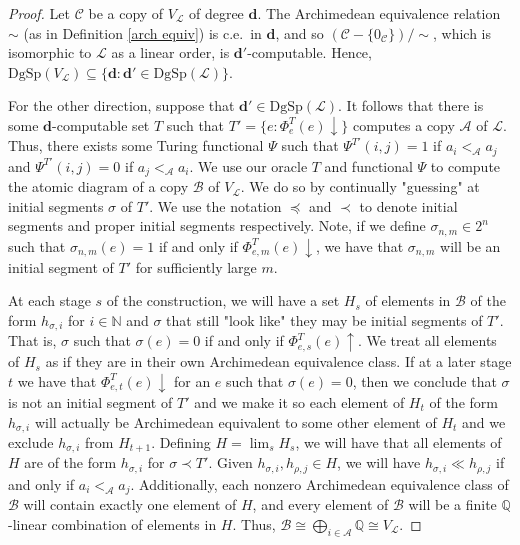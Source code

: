 \documentclass{amsart}%
\numberwithin{theorem}{section}
\newcommand{\Q}{\mathbb{Q}}
\newcommand{\N}{\mathbb{N}}
\newcommand{\A}{\mathcal{A}}
\newcommand{\B}{\mathcal{B}}
\newcommand{\CC}{\mathcal{C}}
\newcommand{\0}{\emptyset}
\newcommand{\ddd}{\boldsymbol{d}}
\newcommand{\LL}{\mathcal{L}}
\newcommand{\dgsp}{\text{DgSp}}
\begin{document}
\begin{proof}
    Let $\CC$ be a copy of $V_\LL$ of degree $\ddd$. The Archimedean equivalence relation $\sim$ (as in Definition \ref{arch equiv}) is c.e.\ in $\ddd$, and so $(\CC-\{0_\CC\})/\!\sim$, which is isomorphic to $\LL$ as a linear order, is $\ddd'$-computable. Hence, $\dgsp(V_\LL)\subseteq \{\ddd:\ddd'\in \dgsp(\LL)\}$.  

    For the other direction, suppose that $\ddd'\in \dgsp(\LL)$. It follows that there is some $\ddd$-computable set $T$ such that $T'=\{e:\Phi^T_e(e)\downarrow\}$ computes a copy $\A$ of $\LL$. Thus, there exists some Turing functional $\Psi$ such that $\Psi^{T'}(i,j)=1$ if $a_i<_\A a_j$ and $\Psi^{T'}(i,j)=0$ if $a_j<_\A a_i$. We use our oracle $T$ and functional $\Psi$ to compute the atomic diagram of a copy $\B$ of $V_\LL$. We do so by continually "guessing" at initial segments $\sigma$ of $T'$. We use the notation $\preceq$ and $\prec$ to denote initial segments and proper initial segments respectively.  Note, if we define $\sigma_{n,m}\in 2^n$ such that $\sigma_{n,m}(e)=1$ if and only if $\Phi^T_{e,m}(e)\downarrow$, we have that $\sigma_{n,m}$ will be an initial segment of $T'$ for sufficiently large $m$. 
    
    At each stage $s$ of the construction, we will have a set $H_s$ of elements in $\B$ of the form $h_{\sigma,i}$ for $i\in \N$ and $\sigma$ that still "look like" they may be initial segments of $T'$. That is, $\sigma$ such that $\sigma(e)=0$ if and only if $\Phi^T_{e,s}(e)\uparrow$. We treat all elements of $H_s$ as if they are in their own Archimedean equivalence class.  If at a later stage $t$ we have that $\Phi^T_{e,t}(e)\downarrow$ for an $e$ such that $\sigma(e)=0$, then we conclude that $\sigma$ is not an initial segment of $T'$ and we make it so each element of $H_t$ of the form $h_{\sigma, i}$ will actually be Archimedean equivalent to some other element of $H_t$ and we exclude $h_{\sigma,i}$ from $H_{t+1}$. Defining $H=\lim_sH_s$, we will have that all elements of $H$ are of the form $h_{\sigma,i}$ for $\sigma\prec T'$. Given $h_{\sigma,i}, h_{\rho,j}\in H$, we will have $h_{\sigma,i}\ll h_{\rho,j}$ if and only if $a_i<_\A a_j$. Additionally, each nonzero Archimedean equivalence class of $\B$ will contain exactly one element of $H$, and every element of $\B$ will be a finite $\Q$-linear combination of elements in $H$. Thus, $\B\cong \bigoplus_{i\in \A} \Q \cong V_\LL$. 


\end{proof}
\end{document}
